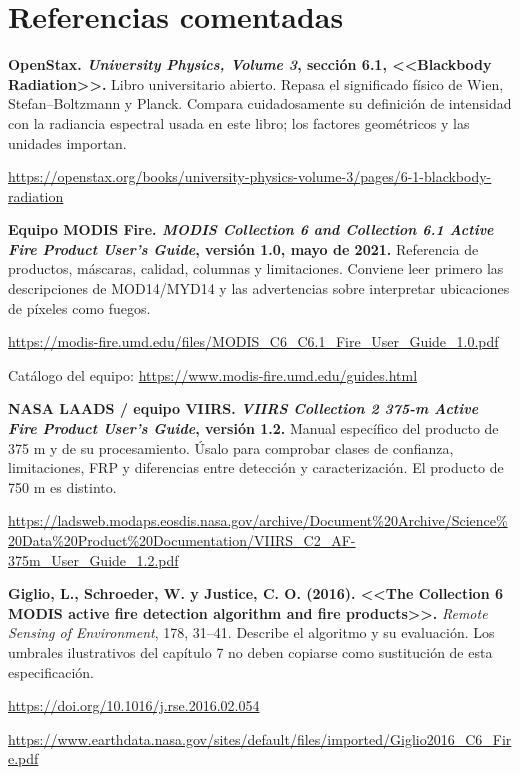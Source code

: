 \section{Referencias comentadas}

\begin{enumerate}[label={[\arabic*]},ref=\arabic*,leftmargin=2.2em,itemsep=1em]
\item\label{src:openstax} \textbf{OpenStax. \emph{University Physics, Volume 3}, sección 6.1,
<<Blackbody Radiation>>.} Libro universitario abierto. Repasa el significado físico de
Wien, Stefan--Boltzmann y Planck. Compara cuidadosamente su definición de intensidad con
la radiancia espectral usada en este libro; los factores geométricos y las unidades importan.
\par\url{https://openstax.org/books/university-physics-volume-3/pages/6-1-blackbody-radiation}

\item\label{src:modis-guide} \textbf{Equipo MODIS Fire. \emph{MODIS Collection 6 and Collection
6.1 Active Fire Product User's Guide}, versión 1.0, mayo de 2021.} Referencia de productos,
máscaras, calidad, columnas y limitaciones. Conviene leer primero las descripciones de
MOD14/MYD14 y las advertencias sobre interpretar ubicaciones de píxeles como fuegos.
\par\url{https://modis-fire.umd.edu/files/MODIS_C6_C6.1_Fire_User_Guide_1.0.pdf}
\par Catálogo del equipo: \url{https://www.modis-fire.umd.edu/guides.html}

\item\label{src:viirs-guide} \textbf{NASA LAADS / equipo VIIRS. \emph{VIIRS Collection 2
375-m Active Fire Product User's Guide}, versión 1.2.} Manual específico del producto
de 375 m y de su procesamiento. Úsalo para comprobar clases de confianza, limitaciones,
FRP y diferencias entre detección y caracterización. El producto de 750 m es distinto.
\par\url{https://ladsweb.modaps.eosdis.nasa.gov/archive/Document%20Archive/Science%20Data%20Product%20Documentation/VIIRS_C2_AF-375m_User_Guide_1.2.pdf}

\item\label{src:giglio2016} \textbf{Giglio, L., Schroeder, W. y Justice, C. O. (2016).
<<The Collection 6 MODIS active fire detection algorithm and fire products>>.}
\emph{Remote Sensing of Environment}, 178, 31--41.
Describe el algoritmo y su evaluación. Los umbrales ilustrativos del capítulo 7 no deben
copiarse como sustitución de esta especificación.
\par\url{https://doi.org/10.1016/j.rse.2016.02.054}
\par\url{https://www.earthdata.nasa.gov/sites/default/files/imported/Giglio2016_C6_Fire.pdf}


\end{enumerate}
